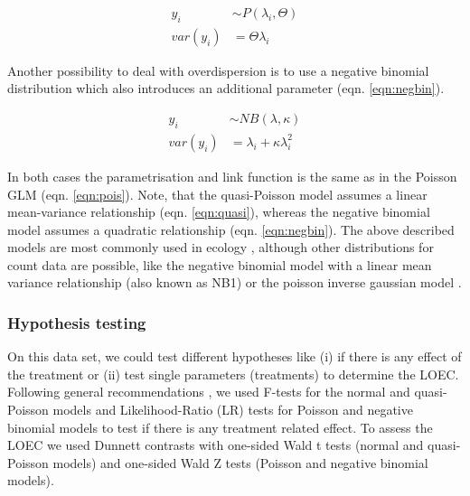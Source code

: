 \documentclass{scrartcl}
\begin{document}
\begin{align}
  y_i &\sim P(\lambda_i, \Theta) \label{eqn:quasi} \\
  var(y_i) &= \Theta \lambda_i  \nonumber
\end{align}

Another possibility to deal with overdispersion is to use a negative binomial distribution which also introduces an additional parameter (eqn. \ref{eqn:negbin}).

\begin{align}
  y_i &\sim NB(\lambda, \kappa) \label{eqn:negbin}  \\
  var(y_i) &= \lambda_i + \kappa \lambda_i^2 \nonumber
\end{align}

In both cases the parametrisation and link function is the same as in the Poisson GLM (eqn. \ref{eqn:pois}).
Note, that the quasi-Poisson model assumes a linear mean-variance relationship (eqn. \ref{eqn:quasi}), whereas the negative binomial model assumes a quadratic relationship (eqn. \ref{eqn:negbin}).
The above described models are most commonly used in ecology \citep{ver_hoef_quasi-poisson_2007}, although other distributions for count data are possible, like the negative binomial model with a linear mean variance relationship (also known as NB1) or the poisson inverse gaussian model \citep{hilbe_modeling_2014}.


\subsubsection{Hypothesis testing}
On this data set, we could test different hypotheses like (i) if there is any effect of the treatment or (ii) test single parameters (treatments) to determine the LOEC.
Following general recommendations \citep{bolker_generalized_2009}, we used F-tests for the normal and quasi-Poisson models and Likelihood-Ratio (LR) tests for Poisson and negative binomial models to test if there is any treatment related effect.
To assess the LOEC we used Dunnett contrasts with one-sided Wald t tests (normal and quasi-Poisson models) and one-sided Wald Z tests (Poisson and negative binomial models).
\end{document}
